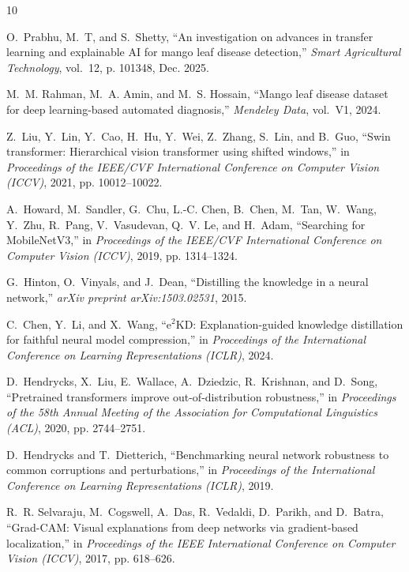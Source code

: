 \documentclass[journal,10pt,twocolumn]{article}
\begin{document}

\begin{thebibliography}{10}

O.~Prabhu, M.~T, and S.~Shetty, ``An investigation on advances in transfer learning and explainable {AI} for mango leaf disease detection,'' \emph{Smart Agricultural Technology}, vol.~12, p. 101348, Dec. 2025.

M.~M. Rahman, M.~A. Amin, and M.~S. Hossain, ``Mango leaf disease dataset for deep learning-based automated diagnosis,'' \emph{Mendeley Data}, vol.~V1, 2024.

Z.~Liu, Y.~Lin, Y.~Cao, H.~Hu, Y.~Wei, Z.~Zhang, S.~Lin, and B.~Guo, ``Swin transformer: Hierarchical vision transformer using shifted windows,'' in \emph{Proceedings of the IEEE/CVF International Conference on Computer Vision (ICCV)}, 2021, pp. 10012--10022.

A.~Howard, M.~Sandler, G.~Chu, L.-C. Chen, B.~Chen, M.~Tan, W.~Wang, Y.~Zhu, R.~Pang, V.~Vasudevan, Q.~V. Le, and H.~Adam, ``Searching for {MobileNetV3},'' in \emph{Proceedings of the IEEE/CVF International Conference on Computer Vision (ICCV)}, 2019, pp. 1314--1324.

G.~Hinton, O.~Vinyals, and J.~Dean, ``Distilling the knowledge in a neural network,'' \emph{arXiv preprint arXiv:1503.02531}, 2015.

C.~Chen, Y.~Li, and X.~Wang, ``$\text{e}^2\text{KD}$: Explanation-guided knowledge distillation for faithful neural model compression,'' in \emph{Proceedings of the International Conference on Learning Representations (ICLR)}, 2024.

D.~Hendrycks, X.~Liu, E.~Wallace, A.~Dziedzic, R.~Krishnan, and D.~Song, ``Pretrained transformers improve out-of-distribution robustness,'' in \emph{Proceedings of the 58th Annual Meeting of the Association for Computational Linguistics (ACL)}, 2020, pp. 2744--2751.

D.~Hendrycks and T.~Dietterich, ``Benchmarking neural network robustness to common corruptions and perturbations,'' in \emph{Proceedings of the International Conference on Learning Representations (ICLR)}, 2019.

R.~R. Selvaraju, M.~Cogswell, A.~Das, R.~Vedaldi, D.~Parikh, and D.~Batra, ``Grad-{CAM}: Visual explanations from deep networks via gradient-based localization,'' in \emph{Proceedings of the IEEE International Conference on Computer Vision (ICCV)}, 2017, pp. 618--626.


\end{thebibliography}
\end{document}
